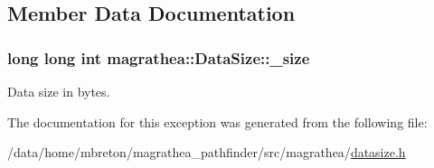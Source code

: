 \subsection{Member Data Documentation}
\hypertarget{exceptionmagrathea_1_1DataSize_afa83372be705d488fcf02d5102d46c9f}{
\subsubsection[{\-\_\-size}]{\setlength{\rightskip}{0pt plus 5cm}long long int magrathea\-::\-Data\-Size\-::\-\_\-size\hspace{0.3cm}{\ttfamily [protected]}}}\label{exceptionmagrathea_1_1DataSize_afa83372be705d488fcf02d5102d46c9f}


Data size in bytes. 



The documentation for this exception was generated from the following file\-:\begin{DoxyCompactItemize}
\item 
/data/home/mbreton/magrathea\-\_\-pathfinder/src/magrathea/\hyperlink{datasize_8h}{datasize.\-h}\end{DoxyCompactItemize}
